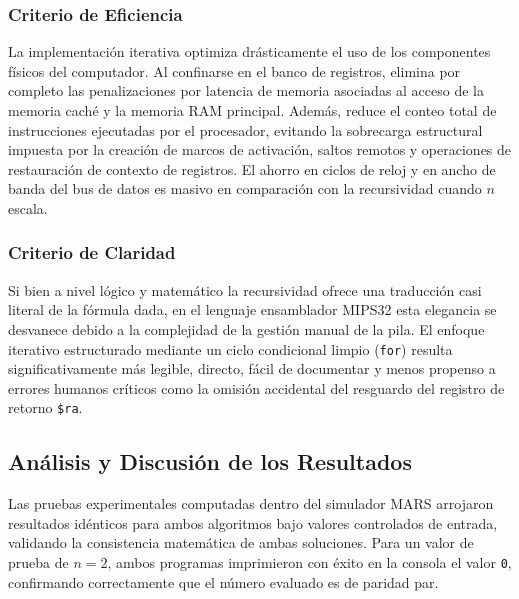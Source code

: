 \documentclass[12pt,letterpaper]{article}
\begin{document}
\subsubsection{Criterio de Eficiencia}
La implementación iterativa optimiza drásticamente el uso de los componentes físicos del computador. Al confinarse en el banco de registros, elimina por completo las penalizaciones por latencia de memoria asociadas al acceso de la memoria caché y la memoria RAM principal. Además, reduce el conteo total de instrucciones ejecutadas por el procesador, evitando la sobrecarga estructural impuesta por la creación de marcos de activación, saltos remotos y operaciones de restauración de contexto de registros. El ahorro en ciclos de reloj y en ancho de banda del bus de datos es masivo en comparación con la recursividad cuando $n$ escala.

\subsubsection{Criterio de Claridad}
Si bien a nivel lógico y matemático la recursividad ofrece una traducción casi literal de la fórmula dada, en el lenguaje ensamblador MIPS32 esta elegancia se desvanece debido a la complejidad de la gestión manual de la pila. El enfoque iterativo estructurado mediante un ciclo condicional limpio (\texttt{for}) resulta significativamente más legible, directo, fácil de documentar y menos propenso a errores humanos críticos como la omisión accidental del resguardo del registro de retorno \texttt{\$ra}.

\subsection{Análisis y Discusión de los Resultados}
Las pruebas experimentales computadas dentro del simulador MARS arrojaron resultados idénticos para ambos algoritmos bajo valores controlados de entrada, validando la consistencia matemática de ambas soluciones. Para un valor de prueba de $n = 2$, ambos programas imprimieron con éxito en la consola el valor \texttt{0}, confirmando correctamente que el número evaluado es de paridad par.
\end{document}
